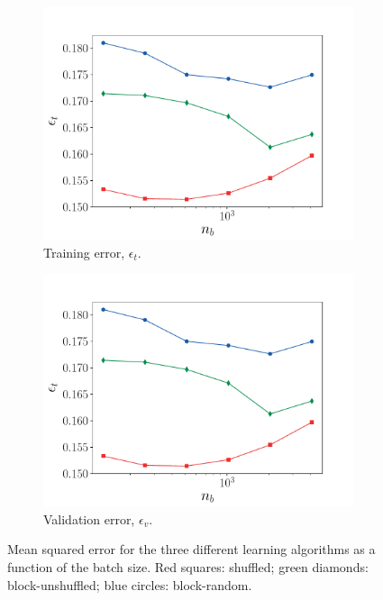 \documentclass[review]{elsarticle}
\begin{document}
\begin{figure}[!tbp]%
  \centering%
  \begin{subfigure}[t]{0.48\textwidth}%
    \includegraphics[page=1, width=\textwidth]{./figs/accuracies_batchsize.pdf}%
    \caption{Training error, $\epsilon_t$.}%
  \end{subfigure}\hfill%
  \begin{subfigure}[t]{0.48\textwidth}%
    \includegraphics[page=2, width=\textwidth]{./figs/accuracies_batchsize.pdf}%
    \caption{Validation error, $\epsilon_v$.}%
  \end{subfigure}%
  \caption{Mean squared error for the three different learning algorithms as a function of the batch size. Red squares: shuffled; green diamonds: block-unshuffled; blue circles: block-random.}\label{fig:accuracies_batchsize}%
\end{figure}%
\end{document}
